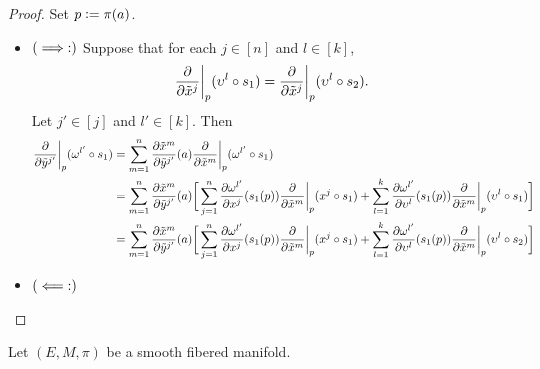 \documentclass{book}
\begin{document}
\begin{proof}
	Set $p \vcentcolon= \pi(a)$.
	\begin{itemize}
		\item $(\implies:) \\$
		Suppose that for each $j \in [n]$ and $l \in [k]$, 
		$$\frac{\partial}{\partial \tilde{x}^j} \bigg|_{p} ( \upsilon^l \circ s_1 ) = \frac{\partial}{\partial \tilde{x}^j} \bigg|_{p} ( \upsilon^l \circ s_2 ).$$
		Let $j' \in [j]$ and $l' \in [k]$. Then 
		\begin{align*}
			\frac{\partial}{\partial \tilde{y}^{j'}} \bigg|_{p} ( \omega^{l'} \circ s_1 )
			& = \sum_{m = 1}^n \frac{\partial \tilde{x}^m}{\partial \tilde{y}^{j'}}(a) \frac{\partial}{\partial \tilde{x}^m} \bigg|_{p} ( \omega^{l'} \circ s_1 ) \\
			& = \sum_{m = 1}^n \frac{\partial \tilde{x}^m}{\partial \tilde{y}^{j'}}(a) \bigg[ \sum_{j = 1}^n \frac{\partial \omega^{l'}}{\partial x^j}(s_1(p)) \frac{\partial }{\partial \tilde{x}^m} \bigg|_p ( x^j \circ s_1) + \sum_{l = 1}^k \frac{\partial \omega^{l'}}{\partial \upsilon^l}(s_1(p))  \frac{\partial }{\partial \tilde{x}^m} \bigg|_p ( \upsilon^l \circ s_1) \bigg]  \\
			& = \sum_{m = 1}^n \frac{\partial \tilde{x}^m}{\partial \tilde{y}^{j'}}(a) \bigg[ \sum_{j = 1}^n \frac{\partial \omega^{l'}}{\partial x^j}(s_1(p)) \frac{\partial }{\partial \tilde{x}^m} \bigg|_p ( x^j \circ s_1) + \sum_{l = 1}^k \frac{\partial \omega^{l'}}{\partial \upsilon^l}(s_1(p))  \frac{\partial }{\partial \tilde{x}^m} \bigg|_p ( \upsilon^l \circ s_2) \bigg]  \\
		\end{align*}
		\item $(\impliedby:) \\$
	\end{itemize}
\end{proof}




\begin{defn}
	Let $(E, M, \pi)$ be a smooth fibered manifold. 
\end{defn}

\begin{ex}
	
\end{ex}
\end{document}
